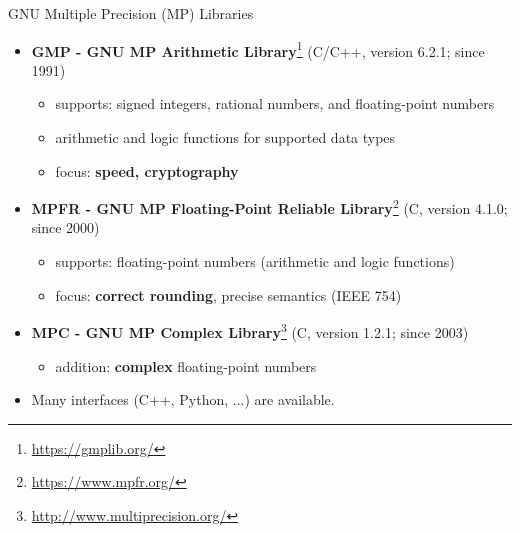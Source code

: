 \begin{frame}{GNU Multiple Precision (MP) Libraries}

\begin{itemize}\itemsep0.5em

\item
\textbf{GMP - GNU MP Arithmetic Library}\footnote{\tiny
\url{https://gmplib.org/}}
(C/C++, version 6.2.1; since 1991)
\begin{itemize}
\item
supports: signed integers, rational numbers, and floating-point numbers

\item
arithmetic and logic functions for supported data types

\item
focus: \textbf{speed, cryptography}
\end{itemize}

\item
\textbf{MPFR - GNU MP Floating-Point Reliable Library}\footnote{\tiny
\url{https://www.mpfr.org/}}
(C, version 4.1.0; since 2000)
\begin{itemize}
\item
supports: floating-point numbers (arithmetic and logic functions)

\item
focus: \textbf{correct rounding}, precise semantics (IEEE 754)
\end{itemize}

\item
\textbf{MPC - GNU MP Complex Library}\footnote{\tiny
\url{http://www.multiprecision.org/}}
(C, version 1.2.1; since 2003)
\begin{itemize}
\item
addition: \textbf{complex} floating-point numbers
\end{itemize}

\bigskip

\item
Many interfaces (C++, Python, ...) are available.

\end{itemize}

\end{frame}



